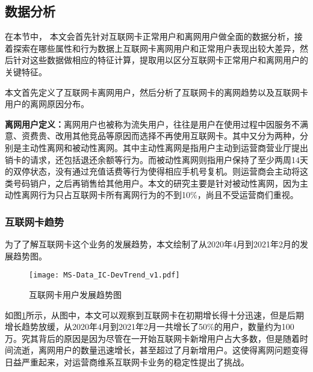 \subsection{数据分析}
在本节中， 本文会首先针对互联网卡正常用户和离网用户做全面的数据分析，接着探索在哪些属性和行为数据上互联网卡离网用户和正常用户表现出较大差异，然后针对这些数据做相应的特征计算，提取用以区分互联网卡正常用户和离网用户的关键特征。\par
本文首先定义了互联网卡离网用户，然后分析了互联网卡的离网趋势以及互联网卡用户的离网原因分布。\par
\textbf{离网用户定义：}离网用户也被称为流失用户，往往是用户在使用过程中因服务不满意、资费贵、改用其他竞品等原因而选择不再使用互联网卡。其中又分为两种，分别是主动性离网和被动性离网。其中主动性离网是指用户主动到运营商营业厅提出销卡的请求，还包括退还余额等行为。而被动性离网则指用户保持了至少两周14天的双停状态，没有通过充值话费等行为使得相应手机号复机。则运营商会主动将这类号码销户，之后再销售给其他用户。本文的研究主要是针对被动性离网，因为主动性离网行为只占互联网卡所有离网行为的不到10\%，尚且不受运营商们重视。
\par

\subsubsection{互联网卡趋势}
为了了解互联网卡这个业务的发展趋势，本文绘制了从2020年4月到2021年2月的发展趋势图。\par
\begin{figure}[hbt]
	\centering
	\texttt{[image: MS-Data\_IC-DevTrend\_v1.pdf]}
	\caption{互联网卡用户发展趋势图}
	\label{Fig:IC-DevTrend}
\end{figure}

如图\ref{Fig:IC-DevTrend}所示，从图中，本文可以观察到互联网卡在初期增长得十分迅速，但是后期增长趋势放缓，从2020年4月到2021年2月一共增长了50\%的用户，数量约为100万。究其背后的原因是因为尽管在一开始互联网卡新增用户占大多数，但是随着时间流逝，离网用户的数量迅速增长，甚至超过了月新增用户。这使得离网问题变得日益严重起来，对运营商维系互联网卡业务的稳定性提出了挑战。

